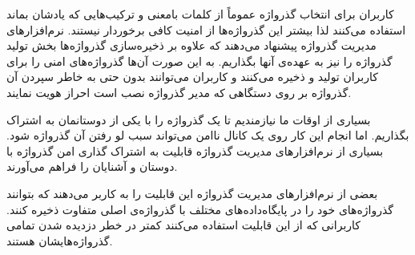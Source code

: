 
کاربران برای انتخاب گذرواژه عموماً از کلمات بامعنی و ترکیب‌هایی که یادشان بماند استفاده می‌کنند لذا بیشتر این گذرواژه‌ها از امنیت کافی برخوردار نیستند. نرم‌افزارهای مدیریت گذرواژه پیشنهاد می‌دهند که علاوه بر ذخیره‌سازی گذرواژه‌ها بخش تولید گذرواژه را نیز به عهده‌ی آنها بگذاریم. به این صورت آن‌ها گذرواژه‌های امنی را برای کاربران تولید و ذخیره می‌کنند و کاربران می‌توانند بدون حتی به خاطر سپردن آن گذرواژه بر روی دستگاهی که مدیر گذرواژه نصب است احراز هویت نمایند.


بسیاری از اوقات ما نیازمندیم تا یک گذرواژه را با یکی از دوستانمان به اشتراک بگذاریم. اما انجام این کار روی یک کانال ناامن می‌تواند سبب لو رفتن آن گذرواژه شود. بسیاری از نرم‌افزارهای مدیریت گذرواژه قابلیت به اشتراک گذاری امن گذرواژه با دوستان و آشنایان را فراهم می‌آورند.


بعضی از نرم‌افزارهای مدیریت گذرواژه این قابلیت را به کاربر می‌دهند که بتوانند گذرواژه‌های خود را در پایگاه‌داده‌های مختلف با گذرواژه‌ی اصلی متفاوت ذخیره کنند. کاربرانی که از این قابلیت استفاده می‌کنند کمتر در خطر دزدیده شدن تمامی گذرواژه‌هایشان هستند.

